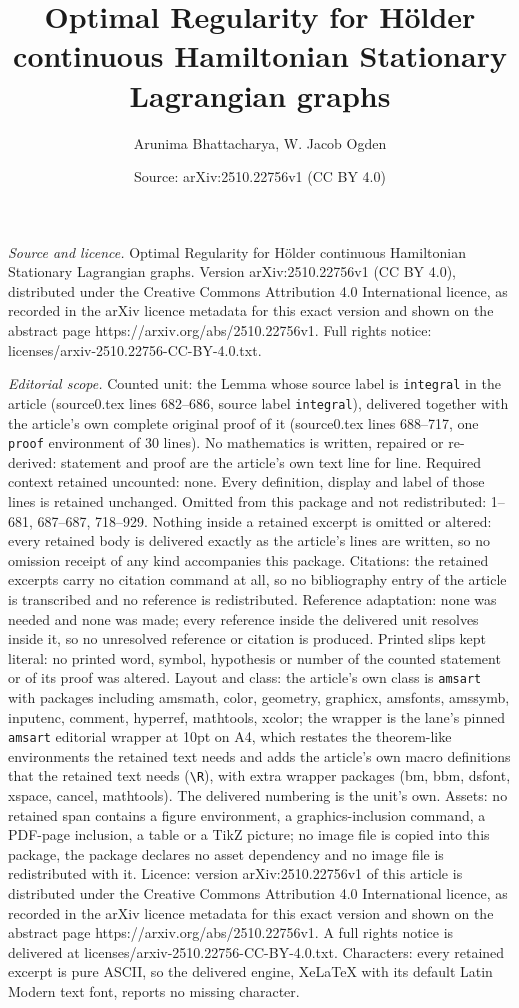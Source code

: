 \documentclass[10pt,a4paper]{amsart}
\title[Optimal Regularity for H\"older continuous Hamiltonian Stati]{Optimal Regularity for H\"older continuous Hamiltonian Stationary Lagrangian graphs}
\author{Arunima Bhattacharya, W. Jacob Ogden}
\date{Source: arXiv:2510.22756v1 (CC BY 4.0)}
\begin{document}
\maketitle

\noindent\emph{Source and licence.} Optimal Regularity for H\"older continuous Hamiltonian Stationary Lagrangian graphs. Version arXiv:2510.22756v1 (CC BY 4.0), distributed under the Creative Commons Attribution 4.0 International licence, as recorded in the arXiv licence metadata for this exact version and shown on the abstract page https://arxiv.org/abs/2510.22756v1. Full rights notice: licenses/arxiv-2510.22756-CC-BY-4.0.txt.\par\smallskip

\noindent\textit{Editorial scope.} Counted unit: the Lemma whose source label is \texttt{integral} in the article (source0.tex lines 682--686, source label \texttt{integral}), delivered together with the article's own complete original proof of it (source0.tex lines 688--717, one \texttt{proof} environment of 30 lines). No mathematics is written, repaired or re-derived: statement and proof are the article's own text line for line. Required context retained uncounted: none. Every definition, display and label of those lines is retained unchanged. Omitted from this package and not redistributed: 1--681, 687--687, 718--929. Nothing inside a retained excerpt is omitted or altered: every retained body is delivered exactly as the article's lines are written, so no omission receipt of any kind accompanies this package. Citations: the retained excerpts carry no citation command at all, so no bibliography entry of the article is transcribed and no reference is redistributed. Reference adaptation: none was needed and none was made; every reference inside the delivered unit resolves inside it, so no unresolved reference or citation is produced. Printed slips kept literal: no printed word, symbol, hypothesis or number of the counted statement or of its proof was altered. Layout and class: the article's own class is \texttt{amsart} with packages including amsmath, color, geometry, graphicx, amsfonts, amssymb, inputenc, comment, hyperref, mathtools, xcolor; the wrapper is the lane's pinned \texttt{amsart} editorial wrapper at 10pt on A4, which restates the theorem-like environments the retained text needs and adds the article's own macro definitions that the retained text needs (\texttt{\textbackslash R}), with extra wrapper packages (bm, bbm, dsfont, xspace, cancel, mathtools). The delivered numbering is the unit's own. Assets: no retained span contains a figure environment, a graphics-inclusion command, a PDF-page inclusion, a table or a TikZ picture; no image file is copied into this package, the package declares no asset dependency and no image file is redistributed with it. Licence: version arXiv:2510.22756v1 of this article is distributed under the Creative Commons Attribution 4.0 International licence, as recorded in the arXiv licence metadata for this exact version and shown on the abstract page https://arxiv.org/abs/2510.22756v1. A full rights notice is delivered at licenses/arxiv-2510.22756-CC-BY-4.0.txt. Characters: every retained excerpt is pure ASCII, so the delivered engine, XeLaTeX with its default Latin Modern text font, reports no missing character.
\end{document}
